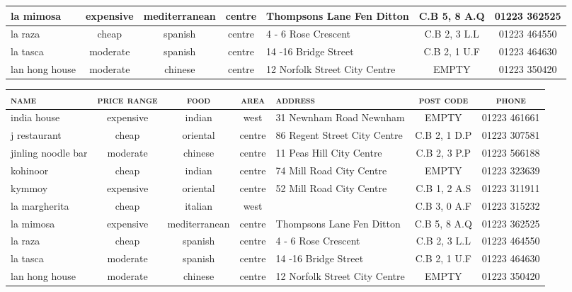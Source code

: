 \documentclass[11pt,letterpaper]{article}
\newcommand{\cellattn}[2]{\cellcolor{navyblue!#1}{#2}}
\begin{document}
\begin{table*}[!thbp]
\begin{subtable}{\textwidth}
\begin{tabular}{| p{2cm} | c | c | c | p{3cm} | c | c |}
    \hline
    la mimosa & expensive & mediterranean & centre & Thompsons Lane Fen Ditton & C.B 5, 8 A.Q & 01223 362525 \\
    \hline
    la raza & cheap & spanish & centre & 4 - 6 Rose Crescent & C.B 2, 3 L.L & 01223 464550 \\
    \hline
    la tasca & moderate & spanish & centre & 14 -16 Bridge Street & C.B 2, 1 U.F & 01223 464630 \\
    \hline
    lan hong house & moderate & chinese & centre & 12 Norfolk Street City Centre & EMPTY & 01223 350420 \\
    \hline
  \end{tabular}
    \caption{Attention heat map: \texttt{la margherita} is a nice restaurant in the west of town in the cheap price
           range}
  \end{subtable}
  \begin{subtable}{\textwidth}
  \begin{tabular}{| p{2cm} | c | c | c | p{3cm} | c | c |}
    \hline
    \textsc{name} & \textsc{price range} & \textsc{food} & \textsc{area} & \textsc{address} & \textsc{post code} & \textsc{phone} \\
    \hline
    india house & expensive & indian & west & 31 Newnham Road Newnham & EMPTY & 01223 461661 \\
    \hline
    j restaurant & cheap & oriental & centre & 86 Regent Street City Centre & C.B 2, 1 D.P & 01223 307581 \\
    \hline
    jinling noodle bar & moderate & chinese & centre & 11 Peas Hill City Centre & C.B 2, 3 P.P & 01223 566188 \\
    \hline
    kohinoor & cheap & indian & centre & 74 Mill Road City Centre & EMPTY & 01223 323639 \\
    \hline
    kymmoy & expensive & oriental & centre & 52 Mill Road City Centre & C.B 1, 2 A.S & 01223 311911 \\
    \hline
    la margherita & cheap & italian & west & \cellattn{99}{15 Magdalene Street City Centre} & C.B 3, 0 A.F & 01223 315232 \\
    \hline
    la mimosa & expensive & mediterranean & centre & Thompsons Lane Fen Ditton & C.B 5, 8 A.Q & 01223 362525 \\
    \hline
    la raza & cheap & spanish & centre & 4 - 6 Rose Crescent & C.B 2, 3 L.L & 01223 464550 \\
    \hline
    la tasca & moderate & spanish & centre & 14 -16 Bridge Street & C.B 2, 1 U.F & 01223 464630 \\
    \hline
    lan hong house & moderate & chinese & centre & 12 Norfolk Street City Centre & EMPTY & 01223 350420 \\
    \hline
  \end{tabular}
    \caption{Attention heap map: Sure , la margherita is on \texttt{15 Magdalene Street City Centre}. }
  \end{subtable}
  \caption{Dialogue visualization 2}
  \label{tab:example2}
\end{table*}
\end{document}
